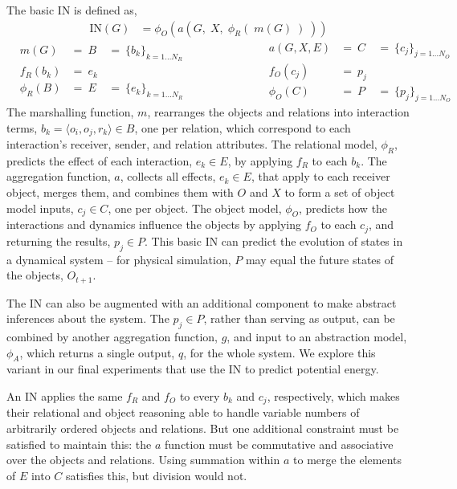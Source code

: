 \documentclass{article}
\newcommand{\NO}{N_O}
\newcommand{\NR}{N_R}
\begin{document}
The basic IN is defined as,
\begin{align}
  \mathrm{IN}(G) &= \phi_O(a(G, \; X, \; \phi_R(\; m(G)\;)\;))
\end{align}
\begin{equation}
\begin{aligned}
  & m(G) &= \: B \: &= \: \{b_k\}_{k=1\dots\NR} \\
  & f_R(b_k) &= \: e_k & \\
  & \phi_R(B) &= \: E \: &= \: \{e_k\}_{k=1\dots\NR}
\end{aligned}
\qquad \qquad \qquad
\begin{aligned}
  & a(G, X, E) &= \: C \: &= \: \{c_j\}_{j=1\dots\NO} \\
  & f_O(c_j) &= \: p_j & \\
  & \phi_O(C) &= \: P \: &= \: \{p_j\}_{j=1\dots\NO}
\end{aligned}
\end{equation}
The marshalling function, $m$, rearranges the objects and relations
into interaction terms, $b_k = \langle o_i, o_j, r_k \rangle \in B$,
one per relation, which correspond to each interaction's receiver,
sender, and relation attributes. The relational model, $\phi_R$,
predicts the effect of each interaction, $e_k \in E$, by applying
$f_R$ to each $b_k$. The aggregation function, $a$, collects all
effects, $e_k \in E$, that apply to each receiver object, merges them,
and combines them with $O$ and $X$ to form a set of object model
inputs, $c_j \in C$, one per object. The object model, $\phi_O$,
predicts how the interactions and dynamics influence the objects by
applying $f_O$ to each $c_j$, and returning the results, $p_j \in
P$. This basic IN can predict the evolution of states in a dynamical
system -- for physical simulation, $P$ may equal the future states of
the objects, $O_{t+1}$.

The IN can also be augmented with an additional component to make
abstract inferences about the system. The $p_j \in P$, rather than
serving as output, can be combined by another aggregation function,
$g$, and input to an abstraction model, $\phi_A$, which returns a
single output, $q$, for the whole system. We explore this variant in
our final experiments that use the IN to predict potential energy.

An IN applies the same $f_R$ and $f_O$ to every $b_k$
and $c_j$, respectively, which makes their relational and object
reasoning able to handle variable numbers of arbitrarily ordered
objects and relations. But one additional constraint must be satisfied
to maintain this: the $a$ function must be commutative and associative
over the objects and relations. Using summation within $a$ to merge
the elements of $E$ into $C$ satisfies this, but division would not.
\end{document}
